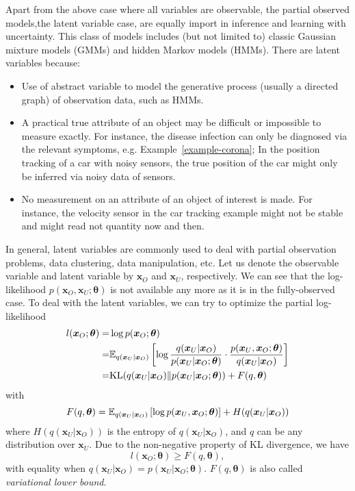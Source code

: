 Apart from the above case where all variables are observable, the partial observed models,the latent variable case, are equally import in inference and learning with uncertainty. This class of models includes (but not limited to) classic Gaussian mixture models (GMMs) and hidden Markov models (HMMs). There are latent variables because:
\begin{itemize}
\item Use of abstract variable to model the generative process (usually a directed graph) of observation data, such as HMMs.
\item A practical true attribute of an object may be difficult or impossible to measure exactly. For instance, the disease infection can only be diagnosed via the relevant symptoms, e.g. Example~\ref{example-corona}; In the position tracking of a car with noisy sensors, the true position of the car might only be inferred via noisy data of sensors.
\item No measurement on an attribute of an object of interest is made. For instance, the velocity sensor in the car tracking example might not be stable and might read not quantity now and then.
\end{itemize}
In general, latent variables are commonly used to deal with partial observation problems, data clustering, data manipulation, etc. Let us denote the observable variable and latent variable by $\bm{x}_O$ and $\bm{x}_U$, respectively. We can see that the log-likelihood $p(\bm{x}_O, \bm{x}_U; \bm{\theta})$ is not available any more as it is in the fully-observed case. To deal with the latent variables, we can try to optimize the partial log-likelihood
\begin{align}
  l(\bm{x}_O; \bm{\theta}) =& \log{p(\bm{x}_O; \bm{\theta})} \nonumber \\  
  = & \mathbb{E}_{q(\bm{x}_U|\bm{x}_O)}\left[ \log{\frac{q(\bm{x}_U|\bm{x}_O)}{p(\bm{x}_U|\bm{x}_O;\bm{\theta})} \cdot \frac{p(\bm{x}_U,\bm{x}_O;\bm{\theta})}{q(\bm{x}_U|\bm{x}_O)}} \right] \nonumber \\
  = & \mathrm{KL}(q(\bm{x}_U|\bm{x}_O)\|p(\bm{x}_U|\bm{x}_O;\bm{\theta})) + F(q, \bm{\theta})
\end{align}
with
\begin{equation}
  F(q, \bm{\theta}) = \mathbb{E}_{q(\bm{x}_U|\bm{x}_O)}\left[ \log{p(\bm{x}_U,\bm{x}_O;\bm{\theta})} \right] + H(q(\bm{x}_U|\bm{x}_O))
\end{equation}
where $H(q(\bm{x}_U|\bm{x}_O))$ is the entropy of $q(\bm{x}_U|\bm{x}_O)$, and $q$ can be any distribution over $\bm{x}_U$. Due to the non-negative property of KL divergence, we have
\begin{equation}
  l(\bm{x}_O; \bm{\theta}) \geq F(q, \bm{\theta}),
\end{equation}
with equality when $q(\bm{x}_U|\bm{x}_O) = p(\bm{x}_U|\bm{x}_O; \bm{\theta})$. $F(q, \bm{\theta})$ is also called \textit{variational lower bound}.

